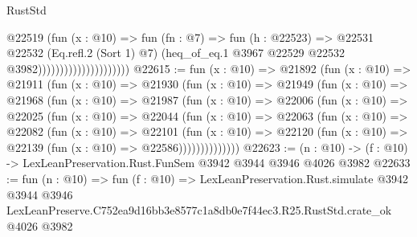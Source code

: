 \begin{lexlean}{RustStd}
\begin{coremodule}
                                        @22519
                                          (fun (x : @10) =>
                                          fun (fn : @7) =>
                                          fun (h : @22523) =>
                                          @22531
                                            @22532
                                            (Eq.refl.{2} (Sort 1) @7)
                                            (heq_of_eq.{1}
                                              @3967
                                              @22529
                                              @22532
                                              @3982)))))))))))))))))))))
@22615 := fun (x : @10) =>
  @21892
    (fun (x : @10) =>
    @21911
      (fun (x : @10) =>
      @21930
        (fun (x : @10) =>
        @21949
          (fun (x : @10) =>
          @21968
            (fun (x : @10) =>
            @21987
              (fun (x : @10) =>
              @22006
                (fun (x : @10) =>
                @22025
                  (fun (x : @10) =>
                  @22044
                    (fun (x : @10) =>
                    @22063
                      (fun (x : @10) =>
                      @22082
                        (fun (x : @10) =>
                        @22101
                          (fun (x : @10) =>
                          @22120 (fun (x : @10) => @22139 (fun (x : @10) => @22586))))))))))))))
@22623 := (n : @10) -> (f : @10) -> LexLeanPreservation.Rust.FunSem @3942 @3944 @3946 @4026 @3982
@22633 := fun (n : @10) =>
  fun (f : @10) =>
  LexLeanPreservation.Rust.simulate
    @3942
    @3944
    @3946
    LexLeanPreserve.C752ea9d16bb3e8577c1a8db0e7f44ec3.R25.RustStd.crate_ok
    @4026
    @3982
\end{coremodule}
\end{lexlean}
